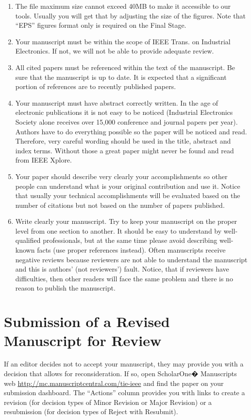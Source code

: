 \documentclass[journal]{IEEEtranTIE}
\begin{document}
\begin{enumerate}[1)]
	\item The file maximum size cannot exceed 40MB to make it accessible to our tools. Usually you will get that by adjusting the size of the figures. Note that ``EPS'' figures format only is required on the Final Stage.
	\item Your manuscript must be within the scope of IEEE Trans. on Industrial Electronics. If not, we will not be able to provide adequate review.
	\item All cited papers must be referenced within the text of the manuscript. Be sure that the manuscript is up to date. It is expected that a significant portion of references are to recently published papers.
	\item Your manuscript must have abstract correctly written. In the age of electronic publications it is not easy to be noticed (Industrial Electronics Society alone receives over 15,000 conference and journal papers per year). Authors have to do everything possible so the paper will be noticed and read. Therefore, very careful wording should be used in the title, abstract and index terms. Without those a great paper might never be found and read from IEEE Xplore.
	\item Your paper should describe very clearly your accomplishments so other people can understand what is your original contribution and use it. Notice that usually your technical accomplishments will be evaluated based on the number of citations but not based on the number of papers published.
	\item Write clearly your manuscript. Try to keep your manuscript on the proper level from one section to another. It should be easy to understand by well-qualified professionals, but at the same time please avoid describing well-known facts (use proper references instead). Often manuscripts receive negative reviews because reviewers are not able to understand the manuscript and this is authors' (not reviewers') fault. Notice, that if reviewers have difficulties, then other readers will face the same problem and there is no reason to publish the manuscript.
\end{enumerate}


\section{Submission of a Revised Manuscript for Review}

If an editor decides not to accept your manuscript, they may provide you with a decision that allows for reconsideration. If so, open ScholarOne� Manuscripts web \url{http://mc.manuscriptcentral.com/tie-ieee} and find the paper on your submission dashboard. The ``Actions'' column provides you with links to create a revision (for decision types of Minor Revision or Major Revision) or a resubmission (for decision types of Reject with Resubmit).
\end{document}
